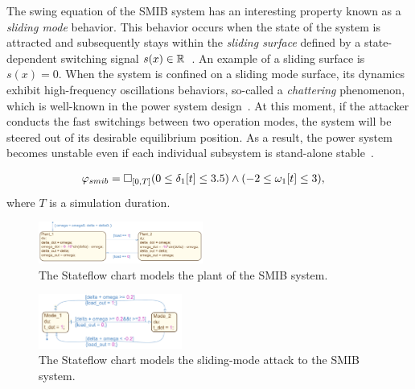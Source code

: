 The swing equation of the SMIB system has an interesting property known as a \emph{sliding mode} behavior. This behavior occurs when the state of the system is attracted and subsequently stays within the \emph{sliding surface} defined by a state-dependent switching signal $s(x)\in\mathbb{R}$~\cite{decarlo1988variable, liu2014coordinated}. An example of a sliding surface is $s(x) = 0$. When the system is confined on a sliding mode surface, its dynamics exhibit high-frequency oscillations behaviors, so-called a \emph{chattering} phenomenon, which is well-known in the power system design~\cite{sabanovic2004variable}.
%
At this moment, if the attacker conducts the fast switchings between two  operation modes, the system will be steered out of its desirable equilibrium position. As a result, the power system becomes unstable even if each individual subsystem is stand-alone stable~\cite{liu2014coordinated}.  
% 

\begin{align} 
\vspace{-1em}
	\varphi_{smib} & = \Box_{[0, T]} (0 \leq \delta_1[t] \leq 3.5) \wedge (-2 \leq \omega_1[t] \leq 3),\formlabel{smib_stl}
\end{align} 
where $T$ is a simulation duration.   

%
\begin{figure}[t!]%
	\centering%
    \includegraphics[width=0.48\textwidth]{image/smib_plant_model}%
	\caption{The Stateflow chart models the plant of the SMIB system.}%
\end{figure}%

\begin{figure}[t!]%
	\centering%
    \includegraphics[width=0.42\textwidth]{image/smib_attack_model}%
	\caption{The Stateflow chart models the sliding-mode attack to the SMIB system.}%
\end{figure}%


